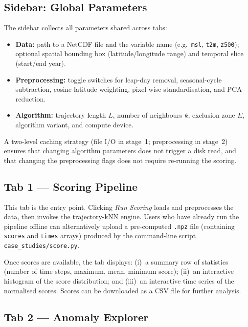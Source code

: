 \documentclass[runningheads]{llncs}
\begin{document}
\subsection{Sidebar: Global Parameters}

The sidebar collects all parameters shared across tabs:
\begin{itemize}
  \item \textbf{Data:} path to a NetCDF file and the variable name
        (e.g.\ \texttt{msl}, \texttt{t2m}, \texttt{z500}); optional
        spatial bounding box (latitude/longitude range) and temporal
        slice (start/end year).
  \item \textbf{Preprocessing:} toggle switches for leap-day removal,
        seasonal-cycle subtraction, cosine-latitude weighting, pixel-wise
        standardisation, and PCA reduction.
  \item \textbf{Algorithm:} trajectory length $L$, number of neighbours $k$,
        exclusion zone $E$, algorithm variant, and compute device.
\end{itemize}
A two-level caching strategy (file I/O in stage~1; preprocessing in stage~2)
ensures that changing algorithm parameters does not trigger a disk read, and
that changing the preprocessing flags does not require re-running the scoring.

\subsection{Tab 1 — Scoring Pipeline}

This tab is the entry point.
Clicking \emph{Run Scoring} loads and preprocesses the data, then invokes
the trajectory-kNN engine.
Users who have already run the pipeline offline can alternatively upload a
pre-computed \texttt{.npz} file (containing \texttt{scores} and
\texttt{times} arrays) produced by the command-line script
\texttt{case\_studies/score.py}.

Once scores are available, the tab displays:
(i)~a summary row of statistics (number of time steps, maximum, mean, minimum
score);
(ii)~an interactive histogram of the score distribution; and
(iii)~an interactive time series of the normalised scores.
Scores can be downloaded as a CSV file for further analysis.

\subsection{Tab 2 — Anomaly Explorer}
\end{document}

